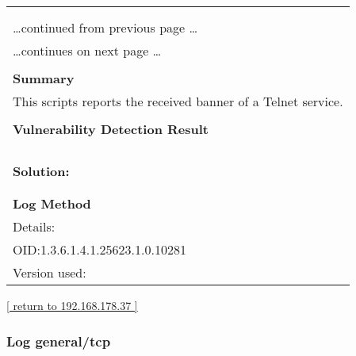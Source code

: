\documentclass{article}
\begin{document}
\begin{longtable}{|p{}|}
\hline
\rowcolor{gvm_log}{\color{white}{Log (CVSS: 0.0) }}\\
\rowcolor{gvm_log}{\color{white}{NVT: Telnet Banner Reporting}}\\
\hline
\endfirsthead
\hfill\ldots continued from previous page \ldots \\
\hline
\endhead
\hline
\ldots continues on next page \ldots \\
\endfoot
\hline
\endlastfoot
\\
\textbf{Summary}\\
This scripts reports the received banner of a Telnet service.\\

        \hline
        \\
\textbf{Vulnerability Detection Result}\\
\rowcolor{white}{\verb=Remote Telnet banner:=}\\
\rowcolor{white}{\verb=opendreambox 2.6.0 dreambox=}\\
\rowcolor{white}{\verb=dreambox login: =}\\

          \hline
          \\
\textbf{Solution:}\\
\\


        \hline
        \\
\textbf{Log Method}\\
Details:
\rowcolor{white}{\verb=Telnet Banner Reporting=}\\
OID:1.3.6.1.4.1.25623.1.0.10281\\
Version used:
\rowcolor{white}{\verb=2022-02-11T08:39:43Z=}\\
\end{longtable}

\begin{footnotesize}\hyperref[host:192.168.178.37]{[ return to 192.168.178.37 ]}\end{footnotesize}
\subsubsection{Log general/tcp}
\label{port:192.168.178.37 general/tcp Log}
\end{document}

